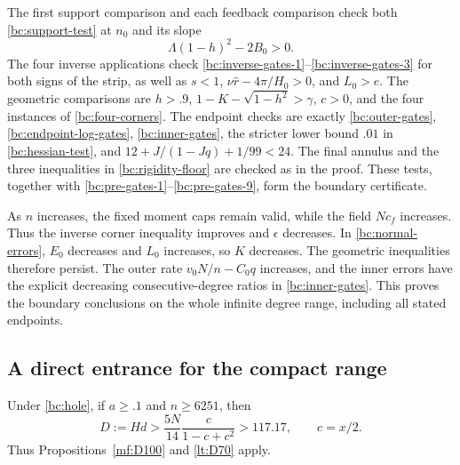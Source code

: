 The first support comparison and each feedback comparison
check both \eqref{bc:support-test} at $n_0$ and its slope
\[
 \Lambda(1-h)^2-2B_0>0.
\]
The four inverse applications check
\eqref{bc:inverse-gates-1}--\eqref{bc:inverse-gates-3} for both signs
of the strip, as well as $s<1$, $\nu\widehat r-4\pi/H_0>0$,
and $L_0>e$.  The geometric comparisons are $h>.9$,
$1-K-\sqrt{1-h^2}>\gamma$, $c>0$, and the four instances of
\eqref{bc:four-corners}.  The endpoint checks are exactly
\eqref{bc:outer-gates}, \eqref{bc:endpoint-log-gates},
\eqref{bc:inner-gates}, the stricter lower bound $.01$ in
\eqref{bc:hessian-test}, and
$12+J/(1-Jq)+1/99<24$.
The final annulus and the three inequalities in
\eqref{bc:rigidity-floor} are checked as in the proof.
These tests, together with \eqref{bc:pre-gates-1}--\eqref{bc:pre-gates-9},
form the boundary certificate.

As $n$ increases, the fixed moment caps remain valid, while the field
$Nc_f$ increases.  Thus the inverse corner inequality improves and
$\epsilon$ decreases.  In \eqref{bc:normal-errors}, $E_0$ decreases
and $L_0$ increases, so $K$ decreases.  The geometric inequalities
therefore persist.  The outer rate $v_0N/n-C_0q$ increases, and the
inner errors have the explicit decreasing consecutive-degree ratios
in \eqref{bc:inner-gates}.  This proves the boundary conclusions on
the whole infinite degree range, including all stated endpoints.

\subsection{A direct entrance for the compact range}

\begin{lemma}\label{bc:crescent}
Under \eqref{bc:hole}, if $a\geq.1$ and $n\geq6251$, then
\begin{equation}\label{bc:crescent-D}
 D:=Hd>\frac{5N}{14}\frac{c}{1-c+c^2}>117.17,
 \qquad c=x/2.
\end{equation}
Thus Propositions~\ref{mf:D100} and \ref{lt:D70} apply.
\end{lemma}

